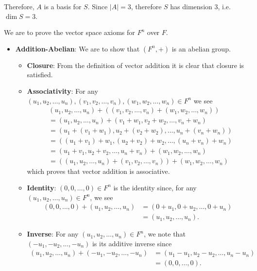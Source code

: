 \begin{questions}
\begin{partquestions}{\alph*}
        Therefore, $A$ is a basis for $S$. Since $|A| = 3$, therefore $S$ has dimension 3, i.e. $\dim{S} = 3$.
    \end{partquestions}
    
    \item We are to prove the vector space axioms for $F^n$ over $F$.
    \begin{itemize}
        \item \textbf{Addition-Abelian}: We are to show that $(F^n, +)$ is an abelian group.
        \begin{itemize}
            \item \textbf{Closure}: From the definition of vector addition it is clear that closure is satisfied.
            
            \item \textbf{Associativity}: For any $(u_1, u_2, \dots, u_n), (v_1, v_2, \dots, v_n), (w_1, w_2, \dots, w_n) \in F^n$ we see
            \begin{align*}
                &(u_1, u_2, \dots, u_n) + ((v_1, v_2, \dots, v_n) + (w_1, w_2, \dots, w_n))\\
                &= (u_1, u_2, \dots, u_n) + (v_1 + w_1, v_2 + w_2, \dots, v_n + w_n)\\
                &= (u_1 + (v_1 + w_1), u_2 + (v_2 + w_2), \dots, u_n + (v_n + w_n))\\
                &= ((u_1 + v_1) + w_1, (u_2 + v_2) + w_2, \dots, (u_n + v_n) + w_n)\\
                &= (u_1 + v_1, u_2 + v_2, \dots, u_n + v_n) + (w_1, w_2, \dots, w_n)\\
                &= ((u_1, u_2, \dots, u_n) + (v_1, v_2, \dots, v_n)) + (w_1, w_2, \dots, w_n)
            \end{align*}
            which proves that vector addition is associative.
            
            \item \textbf{Identity}: $(0, 0, \dots, 0) \in F^n$ is the identity since, for any $(u_1, u_2, \dots, u_n) \in F^n$, we see
            \begin{align*}
                (0, 0, \dots, 0) + (u_1, u_2, \dots, u_n) &= (0 + u_1, 0 + u_2, \dots, 0 + u_n)\\
                &= (u_1, u_2, \dots, u_n).
            \end{align*}
            
            \item \textbf{Inverse}: For any $(u_1, u_2, \dots, u_n) \in F^n$, we note that $(-u_1, -u_2, \dots, -u_n)$ is its additive inverse since
            \begin{align*}
                (u_1, u_2, \dots, u_n) + (-u_1, -u_2, \dots, -u_n) &= (u_1 - u_1, u_2 - u_2, \dots, u_n - u_n)\\
                &= (0, 0, \dots, 0).
            \end{align*}
            

\end{itemize}
\end{itemize}
\end{questions}
